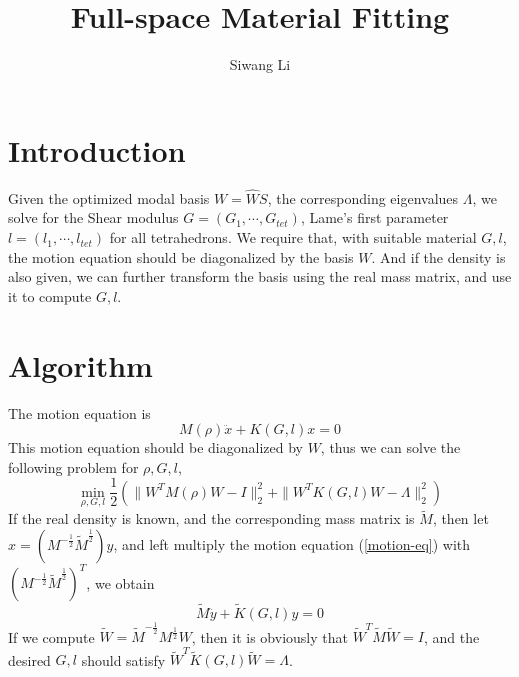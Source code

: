 \documentclass[9pt,twocolumn]{extarticle}
\author{Siwang Li}
\title{Full-space Material Fitting}
\begin{document}
\maketitle

\setlength{\parskip}{0.5ex}

\section{Introduction}
Given the optimized modal basis $W=\hat{W}S$, the corresponding eigenvalues
$\Lambda$, we solve for the Shear modulus $G=(G_1,\cdots,G_{tet})$, Lame's first
parameter $l=(l_1,\cdots,l_{tet})$ for all tetrahedrons. We require that, with
suitable material $G,l$, the motion equation should be diagonalized by the basis
$W$. And if the density is also given, we can further transform the basis using
the real mass matrix, and use it to compute $G,l$.

\section{Algorithm}
The motion equation is
\begin{equation} \label{motion-eq}
  M(\rho)\ddot{x} + K(G,l)x = 0
\end{equation}
This motion equation should be diagonalized by $W$, thus we can solve the
following problem for $\rho,G,l$,
\begin{equation} \label{obj1}
  \min_{\rho,G,l}\frac{1}{2}(\|W^TM(\rho)W-I\|_2^2+\|W^TK(G,l)W-\Lambda\|_2^2)
\end{equation}
If the real density is known, and the corresponding mass matrix is $\tilde{M}$,
then let $x=({M}^{-\frac{1}{2}}\tilde{M}^{\frac{1}{2}})y$, and left multiply the
motion equation (\ref{motion-eq}) with
$({M}^{-\frac{1}{2}}\tilde{M}^{\frac{1}{2}})^T$, we obtain
\begin{equation} \label{motion-eq2}
  \tilde{M}\ddot{y} + \tilde{K}(G,l)y = 0
\end{equation}
If we compute $\tilde{W}=\tilde{M}^{-\frac{1}{2}}M^{\frac{1}{2}}W$, then it is
obviously that $\tilde{W}^T\tilde{M}\tilde{W}=I$, and the desired $G,l$ should
satisfy $\tilde{W}^T\tilde{K}(G,l)\tilde{W}=\Lambda$.
\end{document}
